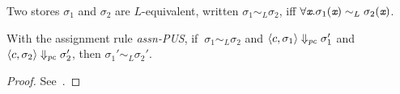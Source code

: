 \begin{mydef}
  Two stores $\sigma_1$ and $\sigma_2$ are $L$-equivalent,
  written $\sigma_1 \sim_L \sigma_2$, iff 
  $\forall \emph{\texttt{x}}. \sigma_1(\emph{\texttt{x}}) \sim_L \sigma_2(\emph{\texttt{x}})$.
\end{mydef}

\begin{myThm}
  With the assignment rule \emph{assn-PUS}, if
  $~\sigma_1 \sim_L \sigma_2$ and $\langle c, \sigma_1 \rangle
  \Downarrow_{\mathit{pc}} \sigma_1' $ and $\langle c, \sigma_2
  \rangle\Downarrow_{\mathit{pc}} \sigma_2' $, then $\sigma_1' \sim_L
  \sigma_2'$.
\end{myThm}
\begin{proof} See~\cite{plas10}.
\end{proof}


